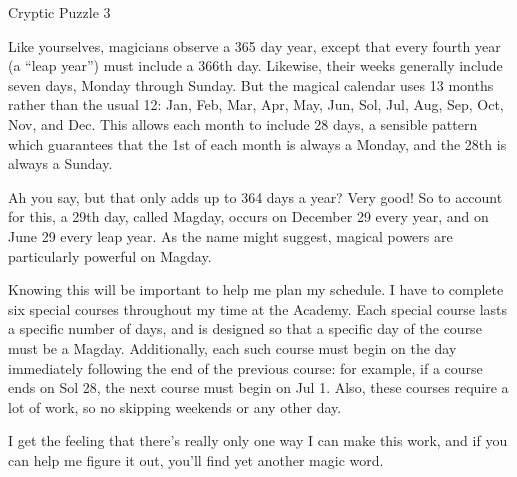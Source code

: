 \documentclass{article}
\newcommand{\clue}[1]{#1}
\begin{document}
\newpage



\clue{
Cryptic Puzzle 3

Like yourselves, magicians observe a 365 day year, except that every fourth year (a “leap year”) must include a 366th day. Likewise, their weeks generally include seven days, Monday through Sunday. But the magical calendar uses 13 months rather than the usual 12: Jan, Feb, Mar, Apr, May, Jun, Sol, Jul, Aug, Sep, Oct, Nov, and Dec. This allows each month to include 28 days, a sensible pattern which guarantees that the 1st of each month is always a Monday, and the 28th is always a Sunday.

Ah you say, but that only adds up to 364 days a year? Very good! So to account for this, a 29th day, called Magday, occurs on December 29 every year, and on June 29 every leap year. As the name might suggest, magical powers are particularly powerful on Magday.

Knowing this will be important to help me plan my schedule. I have to complete six special courses throughout my time at the Academy. Each special course lasts a specific number of days, and is designed so that a specific day of the course must be a Magday. Additionally, each such course must begin on the day immediately following the end of the previous course: for example, if a course ends on Sol 28, the next course must begin on Jul 1. Also, these courses require a lot of work, so no skipping weekends or any other day.

I get the feeling that there's really only one way I can make this work, and if you can
help me figure it out, you'll find yet another magic word.
}

\newpage
\end{document}
